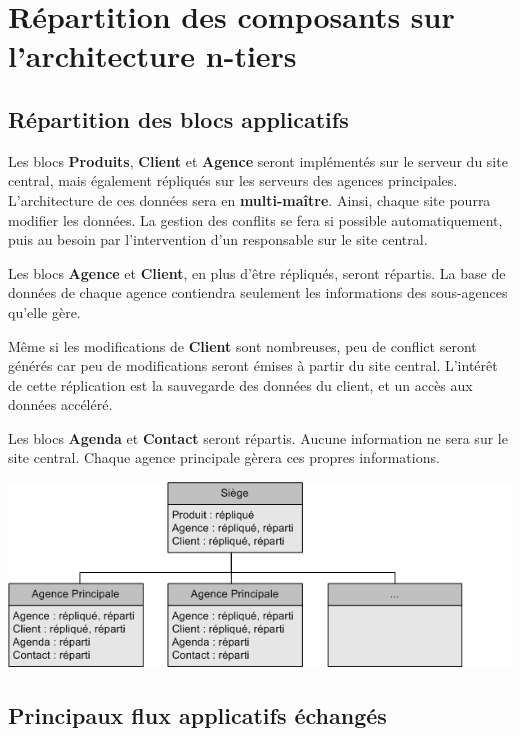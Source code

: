 
\section{Répartition des composants sur l'architecture n-tiers}

\subsection{Répartition des blocs applicatifs}

Les blocs \textbf{Produits}, \textbf{Client} et \textbf{Agence} seront implémentés sur le serveur du site central, mais également répliqués sur les serveurs des agences principales. L'architecture de ces données sera en \textbf{multi-maître}. Ainsi, chaque site pourra modifier les données. La gestion des conflits se fera si possible automatiquement, puis au besoin par l'intervention d'un responsable sur le site central.

Les blocs \textbf{Agence} et \textbf{Client}, en plus d'être répliqués, seront répartis. La base de données de chaque agence contiendra seulement les informations des sous-agences qu'elle gère.

Même si les modifications de \textbf{Client} sont nombreuses, peu de conflict seront générés car peu de modifications seront émises à partir du site central. L'intérêt de cette réplication est la sauvegarde des données du client, et un accès aux données accéléré.

Les blocs \textbf{Agenda} et \textbf{Contact} seront répartis. Aucune information ne sera sur le site central. Chaque agence principale gèrera ces propres informations.

\begin {center}
\includegraphics[width=\textwidth]{repartition_bloc.png}
\end {center}

\subsection{Principaux flux applicatifs échangés}

